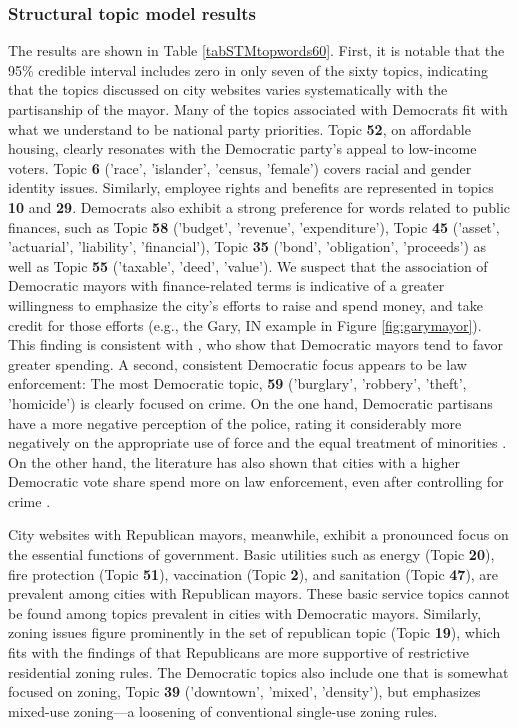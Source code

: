 \documentclass[11pt]{article}
\begin{document}
\subsubsection{Structural topic model results}


The results are shown in Table \ref{tabSTMtopwords60}. First, it is notable that the 95\% credible interval includes zero in only seven of the sixty topics, indicating that the topics discussed on city websites varies systematically with the partisanship of the mayor. Many of the topics associated with Democrats fit with what we understand to be national party priorities. Topic \textbf{52}, on affordable housing, clearly resonates with the Democratic party's appeal to low-income voters. Topic {\bf 6} ('race', 'islander', 'census, 'female') covers racial and gender identity issues. Similarly, employee rights and benefits are represented in topics \textbf{10} and \textbf{29}. Democrats also exhibit a strong preference for words related to public finances, such as Topic \textbf{58} ('budget', 'revenue', 'expenditure'), Topic {\bf 45} ('asset', 'actuarial', 'liability', 'financial'), Topic \textbf{35} ('bond', 'obligation', 'proceeds') as well as Topic \textbf{55} ('taxable', 'deed', 'value'). We suspect that the association of Democratic mayors with finance-related terms is indicative of a greater willingness to emphasize the city's efforts to raise and spend money, and take credit for those efforts (e.g., the Gary, IN example in Figure \ref{fig:garymayor}). This finding is consistent with \cite{Einstein2015}, who show that Democratic mayors tend to favor greater spending. A second, consistent Democratic focus appears to be law enforcement: The most Democratic topic, \textbf{59} ('burglary', 'robbery', 'theft', 'homicide') is clearly focused on crime. On the one hand, Democratic partisans have a more negative perception of the police, rating it considerably more negatively on the appropriate use of force and the equal treatment of minorities \citep{Brown2017}. On the other hand, the literature has also shown that cities with a higher Democratic vote share spend more on law enforcement, even after controlling for crime \citep{Einstein2015}. 

City websites with Republican mayors, meanwhile, exhibit a pronounced focus on the essential functions of government. Basic utilities such as energy (Topic \textbf{20}), fire protection (Topic \textbf{51}), vaccination (Topic \textbf{2}),  and sanitation (Topic \textbf{47}), are prevalent among cities with Republican mayors. These basic service topics cannot be found among topics prevalent in cities with Democratic mayors. Similarly, zoning issues figure prominently in the set of republican topic (Topic \textbf{19}), which fits with the findings of \citet{sorens2018effects} that Republicans are more supportive of restrictive residential zoning rules. The Democratic topics also include one that is somewhat focused on zoning, Topic {\bf 39} ('downtown', 'mixed', 'density'), but emphasizes mixed-use zoning---a loosening of conventional single-use zoning rules.
\end{document}
